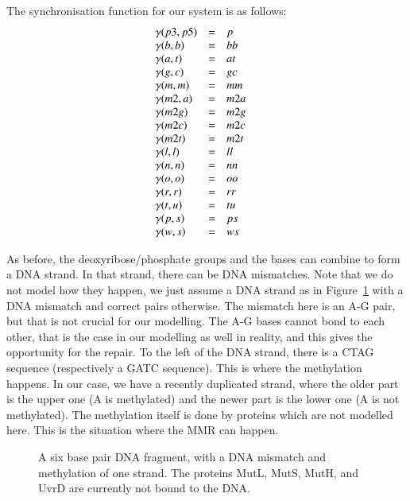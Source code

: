 \documentclass[review]{elsarticle}
\begin{document}
The synchronisation function for our system is as follows:
%
$$\begin{array}{ l c l l }
\gamma(p3,p5) & = & p & \\
\gamma(b,b) & = & bb &\\
\gamma(a,t) & = & at &  \\
\gamma(g,c) & = & gc & \\
\gamma(m,m) & = & mm & \\
\gamma(m2,a) & = & m2a & \\
\gamma(m2g) & = & m2g & \\
\gamma(m2c) & = & m2c & \\
\gamma(m2t) & = & m2t & \\
\gamma(l,l) & = & ll & \\
\gamma(n,n) & = & nn & \\
\gamma(o,o) & = & oo & \\
\gamma(r,r) & = & rr & \\
\gamma(t,u) & = & tu & \\
\gamma(p,s) & = & ps & \\
\gamma(w,s) & = & ws & \\
\end{array}$$

As before, the deoxyribose/phosphate groups and the bases can combine to form a DNA strand. In that strand, there can be DNA mismatches. Note that we do not model how they happen, we just assume a DNA strand as in Figure~\ref{fig:state1} with a DNA mismatch and correct pairs otherwise. The mismatch here is an A-G pair, but that is not crucial for our modelling. The A-G bases cannot bond to each other, that is the case in our modelling as well in reality, and this gives the opportunity for the repair. To the left of the DNA strand, there is a CTAG sequence (respectively a GATC sequence). This is where the methylation happens. In our case, we have a recently duplicated strand, where the older part is the upper one (A is methylated) and the newer part is the lower one (A is not methylated). The methylation itself is done by proteins which are not modelled here. This is the situation where the MMR can happen.

\begin{figure}[h!]
  \centering
  \caption[A six base pair DNA fragment.]{A six base pair DNA fragment, with a DNA mismatch and methylation of one strand. The proteins MutL, MutS, MutH, and UvrD are currently not bound to the DNA.}
  \label{fig:state1}
\end{figure}
\end{document}
